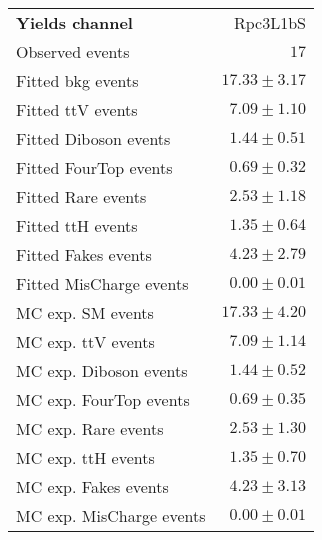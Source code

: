 

\begin{table}
\begin{center}
\setlength{\tabcolsep}{0.0pc}
{\small
\begin{tabular*}{\textwidth}{@{\extracolsep{\fill}}lr}
\noalign{\smallskip}\hline\noalign{\smallskip}
{\bfseries Yields channel}           & Rpc3L1bS              \\[-0.05cm]
\noalign{\smallskip}\hline\noalign{\smallskip}
Observed events          & $17$                    \\
\noalign{\smallskip}\hline\noalign{\smallskip}
Fitted bkg events         & $17.33 \pm 3.17$              \\
\noalign{\smallskip}\hline\noalign{\smallskip}
        Fitted ttV events         & $7.09 \pm 1.10$              \\
        Fitted Diboson events         & $1.44 \pm 0.51$              \\
        Fitted FourTop events         & $0.69 \pm 0.32$              \\
        Fitted Rare events         & $2.53 \pm 1.18$              \\
        Fitted ttH events         & $1.35 \pm 0.64$              \\
        Fitted Fakes events         & $4.23 \pm 2.79$              \\
        Fitted MisCharge events         & $0.00 \pm 0.01$              \\
 \noalign{\smallskip}\hline\noalign{\smallskip}
MC exp. SM events              & $17.33 \pm 4.20$              \\
\noalign{\smallskip}\hline\noalign{\smallskip}
        MC exp. ttV events         & $7.09 \pm 1.14$              \\
        MC exp. Diboson events         & $1.44 \pm 0.52$              \\
        MC exp. FourTop events         & $0.69 \pm 0.35$              \\
        MC exp. Rare events         & $2.53 \pm 1.30$              \\
        MC exp. ttH events         & $1.35 \pm 0.70$              \\
        MC exp. Fakes events         & $4.23 \pm 3.13$              \\
        MC exp. MisCharge events         & $0.00 \pm 0.01$              \\

\end{tabular*}}
\end{center}
\end{table}
